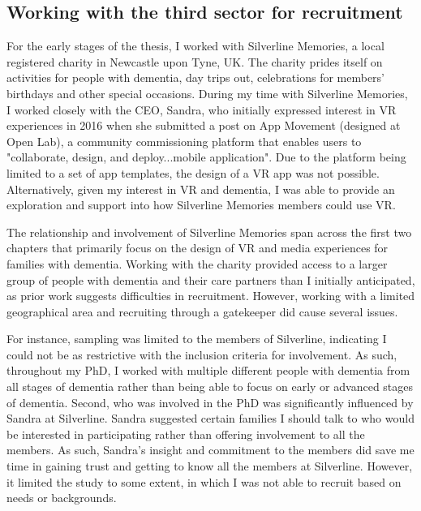 \subsection{Working with the third sector for recruitment}
\label{Method:ThirdSector}
For the early stages of the thesis, I worked with Silverline Memories, a local registered charity in Newcastle upon Tyne, UK. The charity prides itself on activities for people with dementia, day trips out, celebrations for members' birthdays and other special occasions. During my time with Silverline Memories, I worked closely with the CEO, Sandra, who initially expressed interest in VR experiences in 2016 when she submitted a post on App Movement (designed at Open Lab), a community commissioning platform that enables users to "collaborate, design, and deploy...mobile application". Due to the platform being limited to a set of app templates, the design of a VR app was not possible. Alternatively, given my interest in VR and dementia, I was able to provide an exploration and support into how Silverline Memories members could use VR. 

The relationship and involvement of Silverline Memories span across the first two chapters that primarily focus on the design of VR and media experiences for families with dementia. Working with the charity provided access to a larger group of people with dementia and their care partners than I initially anticipated, as prior work suggests difficulties in recruitment. However, working with a limited geographical area and recruiting through a gatekeeper did cause several issues. 

For instance, sampling was limited to the members of Silverline, indicating I could not be as restrictive with the inclusion criteria for involvement. As such, throughout my PhD, I worked with multiple different people with dementia from all stages of dementia rather than being able to focus on early or advanced stages of dementia. Second, who was involved in the PhD was significantly influenced by Sandra at Silverline. Sandra suggested certain families I should talk to who would be interested in participating rather than offering involvement to all the members. As such, Sandra's insight and commitment to the members did save me time in gaining trust and getting to know all the members at Silverline. However, it limited the study to some extent, in which I was not able to recruit based on needs or backgrounds.  

